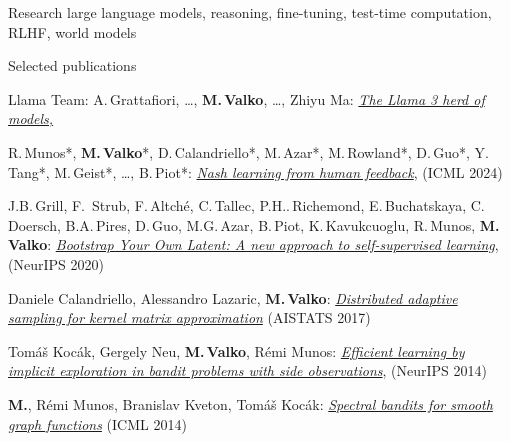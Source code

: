 \documentclass{resume}
\begin{document}
\vspace{-0.5cm}
\begin{category}{Research}
\citemnobullet  large language models, reasoning, fine-tuning, test-time computation, RLHF, world models\end{category}

\begin{category}{Selected publications}
\setlength\itemsep{0.1em}

\citembullet
Llama Team: A.\,Grattafiori, \dots, {\bf M.\,Valko}, \dots, Zhiyu Ma:
\href{https://arxiv.org/pdf/2407.21783}{\emph{The Llama 3 herd of models,}}

\citembullet
R.\,Munos*, {\bf M.\,Valko}*, D.\,Calandriello*, M.\,Azar*, M.\,Rowland*, D.\,Guo*, Y.\,Tang*, M.\,Geist*, \dots, B.\,Piot*:
\href{https://arxiv.org/pdf/2312.00886}{\emph{Nash learning from human feedback}},
({\sf ICML 2024}) 

\citembullet
J.B.\,Grill, F.\, Strub, F.\,Altch\' e, C.\,Tallec, P.H..\,Richemond, E.\,Buchatskaya, C.\,Doersch, B.A.\,Pires, D.\,Guo, M.G.\,Azar, B.\,Piot, K.\,Kavukcuoglu, R.\,Munos, {\bf M. Valko}:
\href{http://researchers.lille.inria.fr/~valko/hp/serve.php?what=publications/grill2020bootstrap}{\emph{Bootstrap Your Own Latent: A new approach to self-supervised learning}},
({\sf NeurIPS 2020}) 




\citembullet
Daniele Calandriello, Alessandro Lazaric, {\bf M.\,Valko}:
\href{http://researchers.lille.inria.fr/~valko/hp/serve.php?what=publications/calandriello2017distributed.pdf}
{\emph{Distributed adaptive sampling for kernel matrix approximation}}
({\sf AISTATS 2017}) 

\citembullet
Tom\'a\v s Koc\' ak, Gergely Neu, {\bf M.\,Valko}, R\' emi Munos:  
\href{http://researchers.lille.inria.fr/~valko/hp/serve.php?what=publications/kocak2014efficient.pdf}
{\emph{Efficient learning by implicit exploration in bandit problems with side observations}}, 
 ({\sf NeurIPS 2014})


\citembullet
{\bf M.\@Valko}, R\' emi Munos, Branislav Kveton, Tom\'a\v s Koc\' ak:
\href{http://researchers.lille.inria.fr/~valko/hp/serve.php?what=publications/valko2014spectral.pdf}
{\emph{Spectral bandits for smooth graph functions}}
({\sf ICML 2014})  


\end{category}
\end{document}
